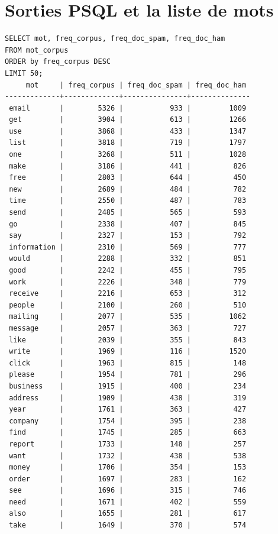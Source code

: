 \documentclass[a4paper,12pt]{article}
\begin{document}
\section{Sorties PSQL et la liste de mots}
	\label{sec:outPSQL}
	\begin{verbatim}
SELECT mot, freq_corpus, freq_doc_spam, freq_doc_ham 
FROM mot_corpus
ORDER by freq_corpus DESC
LIMIT 50;
     mot     | freq_corpus | freq_doc_spam | freq_doc_ham 
-------------+-------------+---------------+--------------
 email       |        5326 |           933 |         1009
 get         |        3904 |           613 |         1266
 use         |        3868 |           433 |         1347
 list        |        3818 |           719 |         1797
 one         |        3268 |           511 |         1028
 make        |        3186 |           441 |          826
 free        |        2803 |           644 |          450
 new         |        2689 |           484 |          782
 time        |        2550 |           487 |          783
 send        |        2485 |           565 |          593
 go          |        2338 |           407 |          845
 say         |        2327 |           153 |          792
 information |        2310 |           569 |          777
 would       |        2288 |           332 |          851
 good        |        2242 |           455 |          795
 work        |        2226 |           348 |          779
 receive     |        2216 |           653 |          312
 people      |        2100 |           260 |          510
 mailing     |        2077 |           535 |         1062
 message     |        2057 |           363 |          727
 like        |        2039 |           355 |          843
 write       |        1969 |           116 |         1520
 click       |        1963 |           815 |          148
 please      |        1954 |           781 |          296
 business    |        1915 |           400 |          234
 address     |        1909 |           438 |          319
 year        |        1761 |           363 |          427
 company     |        1754 |           395 |          238
 find        |        1745 |           285 |          663
 report      |        1733 |           148 |          257
 want        |        1732 |           438 |          538
 money       |        1706 |           354 |          153
 order       |        1697 |           283 |          162
 see         |        1696 |           315 |          746
 need        |        1671 |           402 |          559
 also        |        1655 |           281 |          617
 take        |        1649 |           370 |          574

\end{verbatim}
\end{document}
